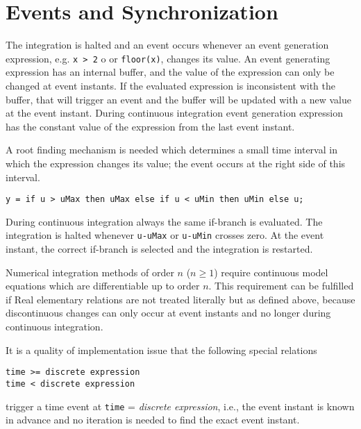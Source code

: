 \section{Events and Synchronization}

The integration is halted and an event occurs whenever an event
generation expression, e.g. \lstinline!x > 2! o or \lstinline!floor(x)!, changes
its value. An event generating expression has an internal buffer, and
the value of the expression can only be changed at event instants. If
the evaluated expression is inconsistent with the buffer, that will
trigger an event and the buffer will be updated with a new value at the
event instant. During continuous integration event generation expression
has the constant value of the expression from the last event instant.

\begin{nonnormative}
A root finding mechanism is needed which determines a small time interval in which the expression changes its value; the event occurs
at the right side of this interval.
\end{nonnormative}

\begin{example}
\begin{lstlisting}[language=modelica]
y = if u > uMax then uMax else if u < uMin then uMin else u;
\end{lstlisting}

During continuous integration always the same if-branch is
evaluated. The integration is halted whenever \lstinline!u-uMax! or \lstinline!u-uMin!
crosses zero. At the event instant, the correct if-branch is
selected and the integration is restarted.

Numerical integration methods of order $n$ ($n \geq 1$) require
continuous model equations which are differentiable up to order $n$. This
requirement can be fulfilled if Real elementary relations are not
treated literally but as defined above, because discontinuous changes
can only occur at event instants and no longer during continuous
integration.
\end{example}

\begin{nonnormative}
It is a quality of implementation issue that the following special relations
\begin{lstlisting}[language=modelica]
time >= discrete expression
time < discrete expression
\end{lstlisting}
trigger a time event at \lstinline!time! = \emph{discrete expression}, i.e., the
event instant is known in advance and no iteration is needed to find the
exact event instant.
\end{nonnormative}

